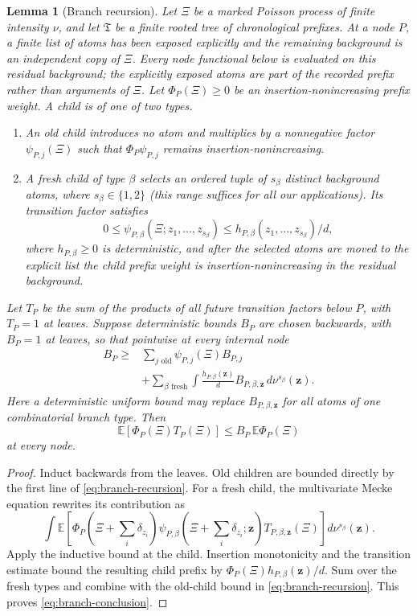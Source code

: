 \documentclass[11pt]{article}
\newtheorem{lemma}[lemma]{Lemma}
\theoremstyle{definition}
\theoremstyle{remark}
\newcommand{\E}{\mathbb E}
\newcommand{\1}{\mathbf 1}
\numberwithin{equation}{section}
\begin{document}
\begin{lemma}[Branch recursion]\label{lem:branch-recursion}
Let $\Xi$ be a marked Poisson process of finite intensity $\nu$, and let
$\mathfrak T$ be a finite rooted tree of chronological prefixes.  At a node
$P$, a finite list of atoms has been exposed explicitly and the remaining
background is an independent copy of $\Xi$.  Every node functional below is
evaluated on this residual background; the explicitly exposed atoms are
part of the recorded prefix rather than arguments of $\Xi$.  Let
$\Phi_P(\Xi)\ge0$ be an insertion-nonincreasing prefix weight.  A child is of one of two types.
\begin{enumerate}
\item An \emph{old} child introduces no atom and multiplies by a nonnegative
factor $\psi_{P,j}(\Xi)$ such that $\Phi_P\psi_{P,j}$ remains
insertion-nonincreasing.
\item A \emph{fresh} child of type $\beta$ selects an ordered tuple of
$s_\beta$ distinct background atoms, where $s_\beta\in\{1,2\}$ (this
range suffices for all our applications).  Its transition factor
satisfies
\[
 0\le\psi_{P,\beta}(\Xi;z_1,\ldots,z_{s_\beta})
 \le h_{P,\beta}(z_1,\ldots,z_{s_\beta})/d,
\]
where $h_{P,\beta}\ge0$ is deterministic, and after the selected atoms are
moved to the explicit list the child prefix weight is
insertion-nonincreasing in the residual background.
\end{enumerate}
Let $T_P$ be the sum of the products of all future transition factors below
$P$, with $T_P=1$ at leaves.  Suppose deterministic bounds $B_P$ are chosen
backwards, with $B_P=1$ at leaves, so that pointwise at every internal node
\begin{equation}\label{eq:branch-recursion}
\begin{aligned}
 B_P\ge{}&\sum_{j\text{ old}}\psi_{P,j}(\Xi)B_{P,j}\\
 &+\sum_{\beta\text{ fresh}}
 \int \frac{h_{P,\beta}(\mathbf z)}d
 B_{P,\beta,\mathbf z}\,d\nu^{s_\beta}(\mathbf z).
\end{aligned}
\end{equation}
Here a deterministic uniform bound may replace
$B_{P,\beta,\mathbf z}$ for all atoms of one combinatorial branch type.
Then
\begin{equation}\label{eq:branch-conclusion}
 \E[\Phi_P(\Xi)T_P(\Xi)]\le B_P\,\E\Phi_P(\Xi)
\end{equation}
at every node.
\end{lemma}
\begin{proof}
Induct backwards from the leaves.  Old children are bounded directly by the
first line of \cref{eq:branch-recursion}.  For a fresh child,
the multivariate Mecke equation rewrites its contribution as
\[
 \int \E\!\left[
  \Phi_P\!\left(\Xi+\sum_i\delta_{z_i}\right)
  \psi_{P,\beta}\!\left(\Xi+\sum_i\delta_{z_i};\mathbf z\right)
  T_{P,\beta,\mathbf z}(\Xi)
 \right]d\nu^{s_\beta}(\mathbf z).
\]
Apply the inductive bound at the child.  Insertion monotonicity and the
transition estimate bound the resulting child prefix by
$\Phi_P(\Xi)h_{P,\beta}(\mathbf z)/d$.  Sum over the fresh types and combine
with the old-child bound in \cref{eq:branch-recursion}.  This proves
\cref{eq:branch-conclusion}.
\end{proof}
\end{document}
